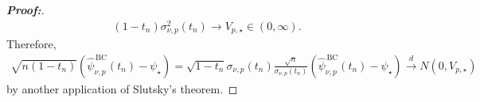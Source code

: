 \documentclass[10pt,a4paper]{amsart}
\begin{document}
\begin{proof}[\textbf{Proof:}]
\begin{align*}
     (1-t_n)\sigma_{\nu,p}^2(t_n) \longrightarrow V_{p,\star}\in(0,\infty).
\end{align*}
Therefore,
\begin{align*}
    \sqrt{n(1-t_n)} \left( \widehat\psi_{\nu,p}^{\,\mathrm{BC}}(t_n)-\psi_\star \right) = \sqrt{1-t_n}\sigma_{\nu,p}(t_n) \frac{\sqrt{n}}{\sigma_{\nu,p}(t_n)} \left( \widehat\psi_{\nu,p}^{\,\mathrm{BC}}(t_n)-\psi_\star \right) \overset{d}{\longrightarrow} N(0,V_{p,\star})
\end{align*}
by another application of Slutsky's theorem.

\end{proof}
\end{document}
